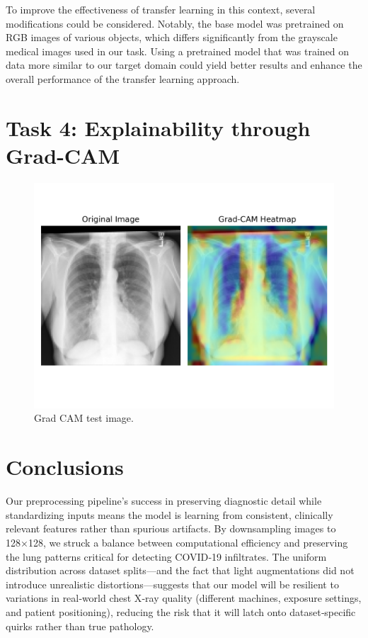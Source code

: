 \documentclass[conference]{IEEEtran}
\begin{document}
To improve the effectiveness of transfer learning in this context, several modifications could be considered. Notably, the base model was pretrained on RGB images of various objects, which differs significantly from the grayscale medical images used in our task. Using a pretrained model that was trained on data more similar to our target domain could yield better results and enhance the overall performance of the transfer learning approach.\\






\section{Task 4: Explainability through Grad-CAM} \label{sec:task_4}

\begin{figure}[htbp]
	\centerline{\includegraphics[width=\linewidth]{Images/gradcam.png}}
	\caption{Grad CAM test image.}
	\label{fig:gradcam}
\end{figure}

\section{Conclusions}\label{sec:conclusions}

Our preprocessing pipeline’s success in preserving diagnostic detail while standardizing inputs means the model is learning from consistent, clinically relevant features rather than spurious artifacts. By downsampling images to 128×128, we struck a balance between computational efficiency and preserving the lung patterns critical for detecting COVID‑19 infiltrates. The uniform distribution across dataset splits—and the fact that light augmentations did not introduce unrealistic distortions—suggests that our model will be resilient to variations in real‑world chest X‑ray quality (different machines, exposure settings, and patient positioning), reducing the risk that it will latch onto dataset‐specific quirks rather than true pathology.
\end{document}
